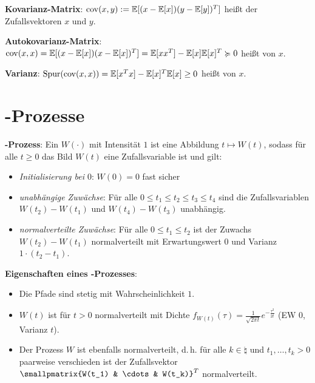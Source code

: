 \textbf{Kovarianz-Matrix}:
$\operatorname{cov}(x, y) := \mathbb{E}[(x - \mathbb{E}[x]) (y - \mathbb{E}[y])^T]$ heißt
 der Zufallsvektoren $x$ und $y$.

\textbf{Autokovarianz-Matrix}:
$\operatorname{cov}(x, x) = \mathbb{E}[(x - \mathbb{E}[x]) (x - \mathbb{E}[x])^T] = \mathbb{E}[xx^T] - \mathbb{E}[x]\mathbb{E}[x]^T \succcurlyeq 0$
heißt  von $x$.

\textbf{Varianz}:
$\operatorname{Spur}(\operatorname{cov}(x, x)) = \mathbb{E}[x^T x] - \mathbb{E}[x]^T \mathbb{E}[x] \ge 0$
heißt  von $x$.

\section{%
    -Prozesse%
}

\textbf{-Prozess}:
Ein 
$W(\cdot)$ mit Intensität $1$ ist eine Abbildung $t \mapsto W(t)$,
sodass für alle $t \ge 0$ das Bild $W(t)$ eine Zufallsvariable ist und gilt:
\begin{itemize}
    \item
    \emph{Initialisierung bei $0$}:
    $W(0) = 0$ fast sicher

    \item
    \emph{unabhängige Zuwächse}:
    Für alle $0 \le t_1 \le t_2 \le t_3 \le t_4$ sind die Zufallsvariablen\\
    $W(t_2) - W(t_1)$ und $W(t_4) - W(t_3)$ unabhängig.

    \item
    \emph{normalverteilte Zuwächse}:
    Für alle $0 \le t_1 \le t_2$ ist der Zuwachs $W(t_2) - W(t_1)$ normalverteilt
    mit Erwartungswert $0$ und Varianz $1 \cdot (t_2 - t_1)$.
\end{itemize}

\textbf{Eigenschaften eines -Prozesses}:
\begin{itemize}
    \item
    Die Pfade sind stetig mit Wahrscheinlichkeit $1$.

    \item
    $W(t)$ ist für $t > 0$ normalverteilt mit Dichte
    $f_{W(t)}(\tau) = \frac{1}{\sqrt{2\pi t}} e^{-\frac{\tau^2}{2t}}$
    (EW $0$, Varianz $t$).

    \item
    Der Prozess $W$ ist ebenfalls normalverteilt, d.\,h.
    für alle $k \in \natural$ und $t_1, \dotsc, t_k > 0$ paarweise verschieden ist
    der Zufallsvektor $\smallpmatrix{W(t_1) & \cdots & W(t_k)}^T$ normalverteilt.
\end{itemize}


